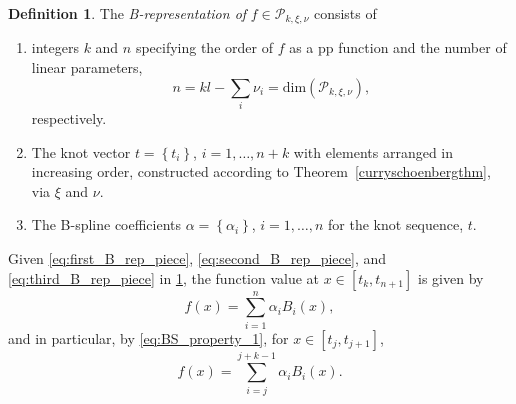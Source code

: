 \documentclass[12pt]{article}
\newcommand{\PP}{\mathcal{P}}
\theoremstyle{definition}
\newtheorem{definition}{Definition}[section]
\begin{document}
\begin{definition} \label{B_representation_definition}
The \emph{B-representation of } $f \in \PP_{k,\xi,\nu}$ consists of 
\begin{enumerate}
\item \label{eq:first_B_rep_piece} integers $k$ and $n$ specifying the order of $f$ as a pp function and the number of linear parameters, 
\[
n = kl - \sum_{i}\nu_i = \mbox{dim}\left(\PP_{k,\xi,\nu}\right),
\]
respectively. 
\item \label{eq:second_B_rep_piece}The knot vector $t = \left \{t_i \right\}$, $i=1,\dots, n+k$ with elements arranged in increasing order, constructed according to Theorem~\ref{curryschoenbergthm}, via $\xi$ and $\nu$.
\item \label{eq:third_B_rep_piece} The B-spline coefficients $\alpha=\left \{\alpha_i \right\}$, $i=1 ,\dots, n$ for the knot sequence, $t$.
\end{enumerate}
\end{definition}
\vspace{1pt}
Given \ref{eq:first_B_rep_piece}, \ref{eq:second_B_rep_piece}, and \ref{eq:third_B_rep_piece} in \ref{B_representation_definition}, the function value at $x\in \left[t_k, t_{n+1}\right]$ is given by 
\begin{equation*}
f\left(x\right) = \sum_{i=1}^n \alpha_i B_i\left(x\right),
\end{equation*}
and in particular, by \ref{eq:BS_property_1}, for $x\in \left[t_j, t_{j+1} \right]$,
\[
f\left(x\right) = \sum_{i=j}^{j+k-1} \alpha_i B_i\left(x\right).
\]
\end{document}
